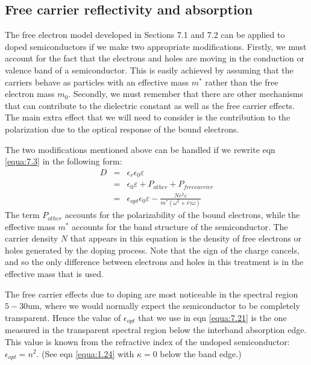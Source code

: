 \documentclass[12pt]{book}
\def\um{\mathrm{um}}
\begin{document}
\subsection{Free carrier reflectivity and absorption}

The free electron model developed in Sections 7.1 and 7.2 can be applied to doped semiconductors if we make two appropriate modifications. Firstly, we must account for the fact that the electrons and holes are moving in the conduction or valence band of a semiconductor. This is easily achieved by assuming that the carriers behave as particles with an effective mass $m^*$ rather than the free electron mass $m_0$. Secondly, we must remember that there are other mechanisms that can contribute to the dielectric constant as well as the free carrier effects. The main extra effect that we will need to consider is the contribution to the polarization due to the optical response of the bound electrons.

The two modifications mentioned above can be handled if we rewrite eqn \ref{equa:7.3} in the following form:
\begin{eqnarray}
\nonumber  D &=& \epsilon_r\epsilon_0\varepsilon  \\
\nonumber   &=& \epsilon_0\varepsilon+P_{other}+P_{free carrier} \\
   &=& \epsilon_{opt}\epsilon_0\varepsilon-\frac{Ne^2\varepsilon}{m^*(\omega^2+i\gamma\omega)} \label{equa:7.21}
\end{eqnarray}
The term $P_{other}$ accounts for the polarizability of the bound electrons, while the effective mass $m^*$ accounts for the band structure of the semiconductor. The carrier density $N$ that appears in this equation is the density of free electrons or holes generated by the doping process. Note that the sign of the charge cancels, and so the only difference between electrons and holes in this treatment is in the effective mass that is used.

The free carrier effects due to doping are most noticeable in the spectral region $5-30\um$, where we would normally expect the semiconductor to be completely transparent. Hence the value of $\epsilon_{opt}$ that we use in eqn \ref{equa:7.21} is the one measured in the transparent spectral region below the interband absorption edge. This value is known from the refractive index of the undoped semiconductor: $\epsilon_{opt} = n^2$. (See eqn \ref{equa:1.24} with $\kappa = 0$ below the band edge.)
\end{document}
